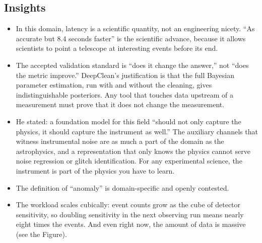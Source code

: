\documentclass[11pt]{article}
\begin{document}
\subsection*{Insights}
\begin{itemize}
    \item In this domain, latency is a scientific quantity, not an engineering nicety. ``As accurate but 8.4 seconds faster'' is the scientific advance, because it allows scientists to point a telescope at interesting events before its end.
    \item The accepted validation standard is ``does it change the answer,'' not ``does the metric improve.'' DeepClean's justification is that the full Bayesian parameter estimation, run with and without the cleaning, gives indistinguishable posteriors. Any tool that touches data upstream of a measurement must prove that it does not change the measurement. %
    \item He stated: a foundation model for this field ``should not only capture the physics, it should capture the instrument as well.'' The auxiliary channels that witness instrumental noise are as much a part of the domain as the astrophysics, and a representation that only knows the physics cannot serve noise regression or glitch identification. For any experimental science, the instrument is part of the physics you have to learn.
    \item The definition of ``anomaly'' is domain-specific and openly contested. %
    \item The workload scales cubically: event counts grow as the cube of detector sensitivity, so doubling sensitivity in the next observing run means nearly eight times the events. And even right now, the amount of data is massive (see the Figure). %
\end{itemize}
\end{document}
